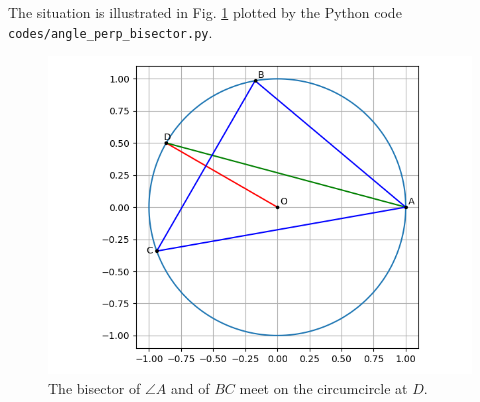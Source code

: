 \documentclass[journal,12pt,twocolumn]{IEEEtran}
\begin{document}
\begin{enumerate}
    The situation is illustrated in Fig. \ref{fig:perp-angle-bisect} plotted 
    by the Python code \texttt{codes/angle\_perp\_bisector.py}.
    \begin{figure}[!ht]
        \centering
        \includegraphics[width=\columnwidth]{figs/angle_perp_bisector.png}
        \caption{The bisector of $\angle A$ and of $BC$ meet on the circumcircle at $D$.}
        \label{fig:perp-angle-bisect}
    \end{figure}
\end{enumerate}
\end{document}
